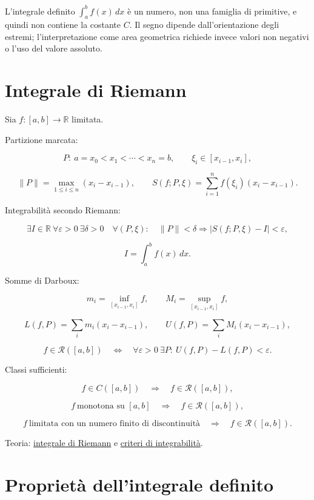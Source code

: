 L'integrale definito \(\int_a^b f(x)\,dx\) è un numero, non una famiglia di primitive, e quindi non contiene la costante \(C\). Il segno dipende dall'orientazione degli estremi; l'interpretazione come area geometrica richiede invece valori non negativi o l'uso del valore assoluto.

\section{Integrale di Riemann}\label{integrale-di-riemann}

Sia \(f:[a,b]\to\mathbb R\) limitata.

Partizione marcata:

\[
\displaystyle
P:\ a=x_0<x_1<\cdots<x_n=b,
\qquad
\xi_i\in[x_{i-1},x_i],
\]

\[
\displaystyle
\lVert P\rVert=\max_{1\le i\le n}(x_i-x_{i-1}),
\qquad
S(f;P,\xi)
=
\sum_{i=1}^{n}f(\xi_i)(x_i-x_{i-1}).
\]

Integrabilità secondo Riemann:

\[
\displaystyle
\exists I\in\mathbb R\ \forall\varepsilon>0\ \exists\delta>0\quad
\forall(P,\xi):
\quad
\lVert P\rVert<\delta
\Longrightarrow
\lvert S(f;P,\xi)-I\rvert<\varepsilon,
\]

\[
\displaystyle
I=\int_a^b f(x)\,dx.
\]

Somme di Darboux:

\[
\displaystyle
m_i=\inf_{[x_{i-1},x_i]}f,
\qquad
M_i=\sup_{[x_{i-1},x_i]}f,
\]

\[
\displaystyle
L(f,P)=\sum_i m_i(x_i-x_{i-1}),
\qquad
U(f,P)=\sum_i M_i(x_i-x_{i-1}),
\]

\[
\displaystyle
f\in\mathcal R([a,b])
\quad\Longleftrightarrow\quad
\forall\varepsilon>0\ \exists P:
\ U(f,P)-L(f,P)<\varepsilon.
\]

Classi sufficienti:

\[
\displaystyle
f\in C([a,b])
\quad\Longrightarrow\quad
f\in\mathcal R([a,b]),
\]

\[
\displaystyle
f\ \text{monotona su }[a,b]
\quad\Longrightarrow\quad
f\in\mathcal R([a,b]),
\]

\[
\displaystyle
f\ \text{limitata con un numero finito di discontinuità}
\quad\Longrightarrow\quad
f\in\mathcal R([a,b]).
\]

Teoria: \href{https://ingegnerismo.it/matematica/integrale-di-riemann/}{integrale di Riemann} e \href{https://ingegnerismo.it/matematica/criteri-di-integrabilita/}{criteri di integrabilità}.

\section{Proprietà dell'integrale definito}\label{proprietuxe0-dellintegrale-definito}

